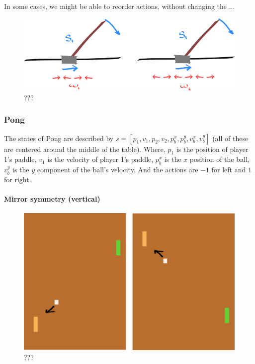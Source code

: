 In some cases, we might be able to reorder actions, without changing the ...

\begin{figure}[!h]
\centering
\includegraphics[width=1\textwidth,height=0.25\textheight]{../../pictures/drawings/cart-pole-temporal-approx.png}
\caption{???}
\end{figure}

\subsubsection{Pong}

The states of Pong are described by $s = [p_1, v_1, p_2, v_2, p^x_b, p^y_b, v^x_b, v^y_b]$ (all of these are centered around the middle of the table). Where, $p_1$ is the position of player 1's paddle, $v_1$ is the velocity of player 1's paddle, $p^x_b$ is the $x$ position of the ball, $v^y_b$ is the $y$ component of the ball's velocity.
And the actions are $-1$ for left and $1$ for right.

\paragraph{Mirror symmetry (vertical)}

\begin{figure}[!h]
\centering
\includegraphics[width=1\textwidth,height=0.25\textheight]{../../pictures/drawings/pong-vert-flip.png}
\caption{???}
\end{figure}



